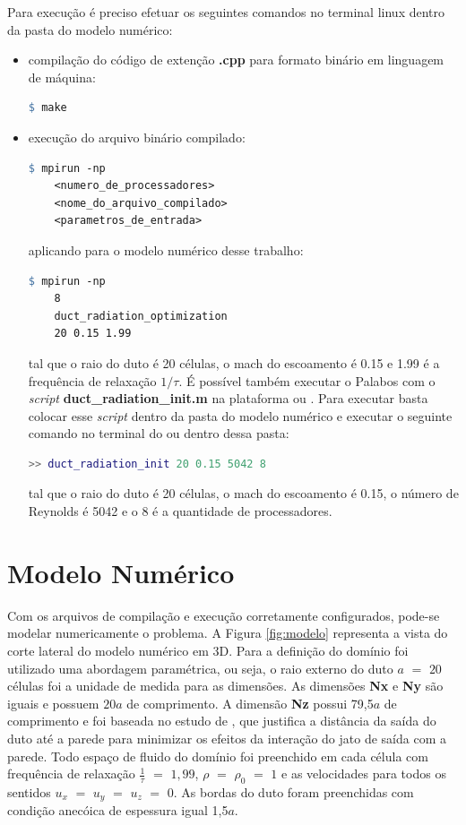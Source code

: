 Para execução é preciso efetuar os seguintes comandos no terminal linux dentro da pasta do modelo numérico:
\begin{itemize}
  \item compilação do código de extenção \textbf{.cpp} para formato binário em linguagem de máquina:
  \begin{lstlisting}[language=make, frame = single]
    $ make
  \end{lstlisting}
  \item execução do arquivo binário compilado:
  \begin{lstlisting}[language=make, frame = single]
    $ mpirun -np 
    <numero_de_processadores> 
    <nome_do_arquivo_compilado> 
    <parametros_de_entrada>
  \end{lstlisting}
  aplicando para o modelo numérico desse trabalho:
  \begin{lstlisting}[language=make, frame = single]
    $ mpirun -np 
    8
    duct_radiation_optimization
    20 0.15 1.99
  \end{lstlisting}
  tal que o raio do duto é 20 células, o mach do escoamento é 0.15 e 1.99 é a frequência de relaxação $1/\tau$. É possível também executar o Palabos com o \textit{script} \textbf{duct\_radiation\_init.m} na plataforma  ou . Para executar basta colocar esse \textit{script} dentro da pasta do modelo numérico e executar o seguinte comando no terminal do  ou  dentro dessa pasta:
  \begin{lstlisting}[language=matlab, frame = single]
    >> duct_radiation_init 20 0.15 5042 8
  \end{lstlisting}
  tal que o raio do duto é 20 células, o mach do escoamento é 0.15, o número de Reynolds é 5042 e o 8 é a quantidade de processadores.
\end{itemize}


\section{Modelo Numérico}

Com os arquivos de compilação e execução corretamente configurados, pode-se modelar numericamente o problema. A Figura \ref{fig:modelo} representa a vista do corte lateral do modelo numérico em 3D. Para a definição do domínio foi utilizado uma abordagem paramétrica, ou seja, o raio externo do duto $a$ $=$ $20$ células foi a unidade de medida para as dimensões. As dimensões \textbf{Nx} e \textbf{Ny} são iguais e possuem $20a$ de comprimento. A dimensão \textbf{Nz} possui 79,5$a$ de comprimento e foi baseada no estudo de , que justifica a distância da saída do duto até a parede para minimizar os efeitos da interação do jato de saída com a parede. Todo espaço de fluido do domínio foi preenchido em cada célula com frequência de relaxação $\frac{1}{\tau}$ $=$ $1,99$, $\rho$ $=$ $\rho_{0}$ $=$ $1$ e as velocidades para todos os sentidos $u_{x}$ $=$ $u_{y}$ $=$ $u_{z}$ $=$ $0$. As bordas do duto foram preenchidas com condição anecóica de espessura igual 1,5$a$.      


